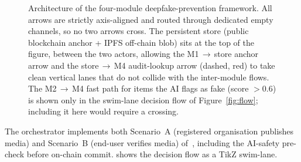 \documentclass[11pt,a4paper]{article}
\theoremstyle{definition}
\theoremstyle{plain}
\theoremstyle{remark}
\begin{document}
\begin{figure}[!ht]

\caption{Architecture of the four-module deepfake-prevention framework.
All arrows are strictly axis-aligned and routed through dedicated
empty channels, so no two arrows cross. The persistent store
(public blockchain anchor + IPFS off-chain blob) sits at the top of
the figure, between the two actors, allowing the
M1\,$\rightarrow$\,store anchor arrow and the
store\,$\rightarrow$\,M4 audit-lookup arrow (dashed, red) to take
clean vertical lanes that do not collide with the inter-module
flows. The M2\,$\rightarrow$\,M4 fast path for items the AI flags as
fake (score $>\!0.6$) is shown only in the swim-lane decision flow
of Figure~\ref{fig:flow}; including it here would require a
crossing.}\label{fig:arch}
\end{figure}

The orchestrator implements both Scenario~A (registered organisation
publishes media) and Scenario~B (end-user verifies media) of~\cite{bib4},
including the AI-safety pre-check before on-chain commit.
 shows the decision flow as a TikZ swim-lane.
\end{document}
